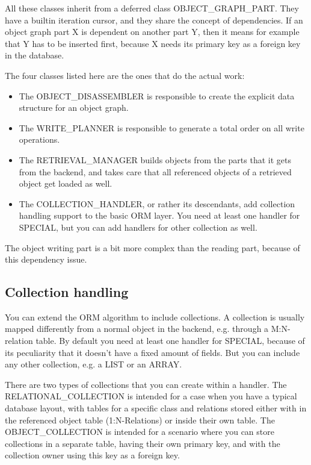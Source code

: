 All these classes inherit from a deferred class OBJECT\_GRAPH\_PART. 
They have a builtin iteration cursor, and they share the concept of dependencies.
If an object graph part X is dependent on another part Y, then it means for example that Y has to be inserted first, because X needs its primary key as a foreign key in the database.

The four classes listed here are the ones that do the actual work:

\begin{itemize}
 \item The OBJECT\_DISASSEMBLER is responsible to create the explicit data structure for an object graph.
 \item The WRITE\_PLANNER is responsible to generate a total order on all write operations.
 \item The RETRIEVAL\_MANAGER builds objects from the parts that it gets from the backend, and takes care that all referenced objects of a retrieved object get loaded as well.
 \item The COLLECTION\_HANDLER, or rather its descendants, add collection handling support to the basic ORM layer. You need at least one handler for SPECIAL, but you can add handlers for other collection as well.
\end{itemize}

The object writing part is a bit more complex than the reading part, because of this dependency issue.



\subsection{Collection handling}

You can extend the ORM algorithm to include collections. A collection is usually mapped differently from a normal object in the backend, e.g. through a M:N-relation table.
By default you need at least one handler for SPECIAL, because of its peculiarity that it doesn't have a fixed amount of fields.
But you can include any other collection, e.g. a LIST or an ARRAY.

There are two types of collections that you can create within a handler. 
The RELATIONAL\_COLLECTION is intended for a case when you have a typical database layout, with tables for a specific class and relations stored either with in the referenced object table (1:N-Relations) or inside their own table.
The OBJECT\_COLLECTION is intended for a scenario where you can store collections in a separate table, having their own primary key, and with the collection owner using this key as a foreign key.

